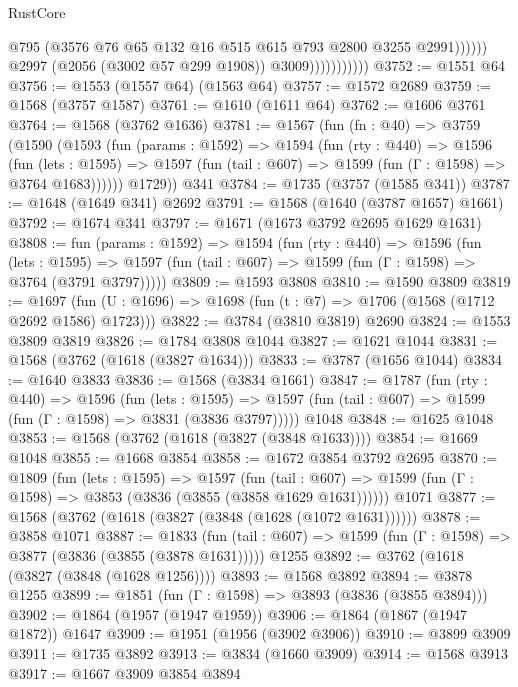 \begin{lexlean}{RustCore}
\begin{coremodule}
                                    @795
                                    (@3576 @76 @65 @132 @16 @515 @615 @793 @2800 @3255 @2991))))))
                          @2997
                          (@2056 (@3002 @57 @299 @1908))
                          @3009)))))))))))
@3752 := @1551 @64
@3756 := @1553 (@1557 @64) (@1563 @64)
@3757 := @1572 @2689
@3759 := @1568 (@3757 @1587)
@3761 := @1610 (@1611 @64)
@3762 := @1606 @3761
@3764 := @1568 (@3762 @1636)
@3781 := @1567
    (fun (fn : @40) =>
    @3759
      (@1590
        (@1593
          (fun (params : @1592) =>
          @1594
            (fun (rty : @440) =>
            @1596
              (fun (lets : @1595) =>
              @1597 (fun (tail : @607) => @1599 (fun (Γ : @1598) => @3764 @1683))))))
        @1729))
    @341
@3784 := @1735 (@3757 (@1585 @341))
@3787 := @1648 (@1649 @341) @2692
@3791 := @1568 (@1640 (@3787 @1657) @1661)
@3792 := @1674 @341
@3797 := @1671 (@1673 @3792 @2695 @1629 @1631)
@3808 := fun (params : @1592) =>
  @1594
    (fun (rty : @440) =>
    @1596
      (fun (lets : @1595) =>
      @1597 (fun (tail : @607) => @1599 (fun (Γ : @1598) => @3764 (@3791 @3797)))))
@3809 := @1593 @3808
@3810 := @1590 @3809
@3819 := @1697 (fun (U : @1696) => @1698 (fun (t : @7) => @1706 (@1568 (@1712 @2692 @1586) @1723)))
@3822 := @3784 (@3810 @3819) @2690
@3824 := @1553 @3809 @3819
@3826 := @1784 @3808 @1044
@3827 := @1621 @1044
@3831 := @1568 (@3762 (@1618 (@3827 @1634)))
@3833 := @3787 (@1656 @1044)
@3834 := @1640 @3833
@3836 := @1568 (@3834 @1661)
@3847 := @1787
    (fun (rty : @440) =>
    @1596
      (fun (lets : @1595) =>
      @1597 (fun (tail : @607) => @1599 (fun (Γ : @1598) => @3831 (@3836 @3797)))))
    @1048
@3848 := @1625 @1048
@3853 := @1568 (@3762 (@1618 (@3827 (@3848 @1633))))
@3854 := @1669 @1048
@3855 := @1668 @3854
@3858 := @1672 @3854 @3792 @2695
@3870 := @1809
    (fun (lets : @1595) =>
    @1597
      (fun (tail : @607) => @1599 (fun (Γ : @1598) => @3853 (@3836 (@3855 (@3858 @1629 @1631))))))
    @1071
@3877 := @1568 (@3762 (@1618 (@3827 (@3848 (@1628 (@1072 @1631))))))
@3878 := @3858 @1071
@3887 := @1833
    (fun (tail : @607) => @1599 (fun (Γ : @1598) => @3877 (@3836 (@3855 (@3878 @1631)))))
    @1255
@3892 := @3762 (@1618 (@3827 (@3848 (@1628 @1256))))
@3893 := @1568 @3892
@3894 := @3878 @1255
@3899 := @1851 (fun (Γ : @1598) => @3893 (@3836 (@3855 @3894)))
@3902 := @1864 (@1957 (@1947 @1959))
@3906 := @1864 (@1867 (@1947 @1872)) @1647
@3909 := @1951 (@1956 (@3902 @3906))
@3910 := @3899 @3909
@3911 := @1735 @3892
@3913 := @3834 (@1660 @3909)
@3914 := @1568 @3913
@3917 := @1667 @3909 @3854 @3894

\end{coremodule}
\end{lexlean}
